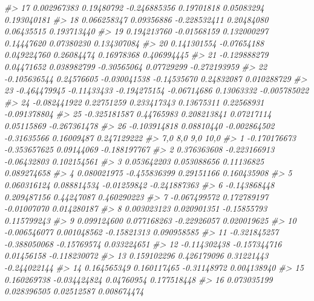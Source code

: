 \documentclass[
]{article}
\newenvironment{Shaded}{\begin{snugshade}}{\end{snugshade}}
\newcommand{\CommentTok}[1]{\textcolor[rgb]{0.56,0.35,0.01}{\textit{#1}}}
\begin{document}
\begin{Shaded}
\begin{Highlighting}[]
\CommentTok{\#\textgreater{} 17  0.002967383  0.19480792 {-}0.246885356  0.19701818  0.05083294  0.193040181}
\CommentTok{\#\textgreater{} 18  0.066258347  0.09356886 {-}0.228532411  0.20484080  0.06435515  0.193713440}
\CommentTok{\#\textgreater{} 19  0.194213760 {-}0.01568159  0.132000297  0.14447620  0.07380230  0.134307084}
\CommentTok{\#\textgreater{} 20  0.141301554 {-}0.07654188  0.049224760  0.26084474  0.16978368  0.406994445}
\CommentTok{\#\textgreater{} 21 {-}0.129888279  0.04471652  0.038982799 {-}0.30565064  0.07729299 {-}0.272193959}
\CommentTok{\#\textgreater{} 22 {-}0.105636544  0.24576605 {-}0.030041538 {-}0.14535670  0.24832087  0.010288729}
\CommentTok{\#\textgreater{} 23 {-}0.464479945 {-}0.11433433 {-}0.194275154 {-}0.06714686  0.13063332 {-}0.005785022}
\CommentTok{\#\textgreater{} 24 {-}0.082441922  0.22751259  0.233417343  0.13675311  0.22568931 {-}0.091378804}
\CommentTok{\#\textgreater{} 25 {-}0.325181587  0.44765983  0.208213841  0.07217114  0.05115869 {-}0.267361478}
\CommentTok{\#\textgreater{} 26 {-}0.103914818  0.08810440 {-}0.002864502 {-}0.31635566  0.16009487  0.247129222}
\CommentTok{\#\textgreater{}             7,0          8,0         9,0         10,0}
\CommentTok{\#\textgreater{} 1  {-}0.170176673 {-}0.353657625  0.09144069 {-}0.188197767}
\CommentTok{\#\textgreater{} 2   0.376363608 {-}0.223166913 {-}0.06432803  0.102154561}
\CommentTok{\#\textgreater{} 3   0.053642203  0.053088656  0.11136825  0.089274658}
\CommentTok{\#\textgreater{} 4   0.080021975 {-}0.455836399  0.29151166  0.160435908}
\CommentTok{\#\textgreater{} 5   0.060316124  0.088814534 {-}0.01259842 {-}0.241887363}
\CommentTok{\#\textgreater{} 6  {-}0.143868448  0.209487156  0.44247087  0.460290223}
\CommentTok{\#\textgreater{} 7  {-}0.067499572  0.172789197 {-}0.01007070  0.014280187}
\CommentTok{\#\textgreater{} 8   0.003023123  0.020901351 {-}0.15855793  0.115799243}
\CommentTok{\#\textgreater{} 9   0.099124600  0.077168263 {-}0.22926057  0.020019625}
\CommentTok{\#\textgreater{} 10 {-}0.006546077  0.001048562 {-}0.15821313  0.090958585}
\CommentTok{\#\textgreater{} 11 {-}0.321845257 {-}0.388050068 {-}0.15769574  0.033224651}
\CommentTok{\#\textgreater{} 12 {-}0.114302438 {-}0.157344716  0.01456158 {-}0.118230072}
\CommentTok{\#\textgreater{} 13  0.159102296  0.426179096  0.31221443 {-}0.244022144}
\CommentTok{\#\textgreater{} 14  0.164565349  0.160117465 {-}0.31148972  0.004138940}
\CommentTok{\#\textgreater{} 15  0.160269738 {-}0.034424824  0.04760954  0.177518448}
\CommentTok{\#\textgreater{} 16  0.073035199  0.028396505  0.02512587  0.008674474}

\end{Highlighting}
\end{Shaded}
\end{document}
